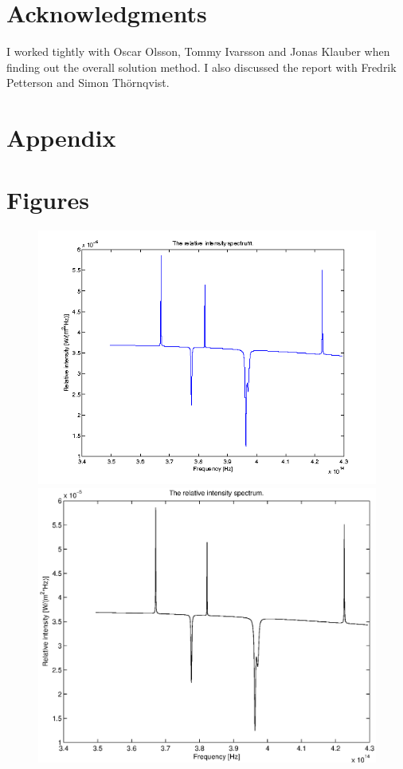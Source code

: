 \documentclass[10pt, a4paper]{article}
\begin{document}
\section{Acknowledgments}

I worked tightly with Oscar Olsson, Tommy Ivarsson and Jonas Klauber when finding out the overall solution method. I also discussed the report with Fredrik Petterson and Simon Thörnqvist.

{}


\newpage
\section*{Appendix}
\appendix
\section{Figures} \label{appendix:figures}

\begin{figure}[hbt]
\begin{center}
\ifpdf
	\includegraphics[width=\linewidth]{../img/spectrum_relative.png}
\else
	\includegraphics[width=\linewidth]{../img/spectrum_relative.eps}
\fi
\end{center}
\caption{}
\label{fig:rellspec}
\end{figure}
\end{document}
